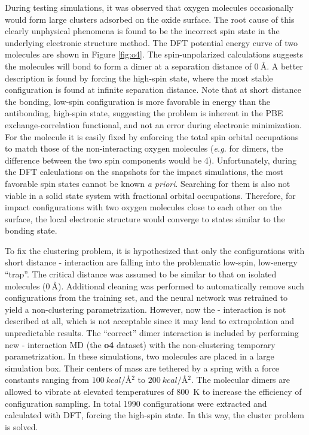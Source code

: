 \message{ !name(paper.tex)}\documentclass[manuscript=cmatex]{achemso}
\begin{document}
During testing simulations, it was observed that oxygen molecules occasionally would form large clusters adsorbed on the oxide surface. The root cause of this clearly unphysical phenomena is found to be the incorrect spin state in the underlying electronic structure method. The DFT potential energy curve of two  molecules are shown in Figure \ref{fig:o4}. The spin-unpolarized calculations suggests the molecules will bond to form a  dimer at a separation distance of \textbf{$\SI{0}{\angstrom}$}. A better description is found by forcing the high-spin state, where the most stable configuration is found at infinite separation distance. Note that at short distance the bonding, low-spin configuration is more favorable in energy than the antibonding, high-spin state, suggesting the problem is inherent in the PBE exchange-correlation functional, and not an error during electronic minimization. For the molecule it is easily fixed by enforcing the total spin orbital occupations to match those of the non-interacting oxygen molecules (\textit{e.g.} for dimers, the difference between the two spin components would be 4). Unfortunately, during the DFT calculations on the snapshots for the impact simulations, the most favorable spin states cannot be known \textit{a priori}. Searching for them is also not viable in a solid state system with fractional orbital occupations. Therefore, for impact configurations with two oxygen molecules close to each other on the surface, the local electronic structure would converge to states similar to the bonding state. 

To fix the clustering problem, it is hypothesized that only the configurations with short distance - interaction are falling into the problematic low-spin, low-energy ``trap''. The critical distance was assumed to be similar to that on isolated molecules (\textbf{$\SI{0}{\angstrom}$}). Additional cleaning was performed to automatically remove such configurations from the training set, and the neural network was retrained to yield a non-clustering parametrization. However, now the - interaction is not described at all, which is not acceptable since it may lead to extrapolation and unpredictable results. The ``correct'' dimer interaction is included by performing new - interaction MD (the \textbf{o4} dataset) with the non-clustering temporary parametrization. In these simulations, two  molecules are placed in a large simulation box. Their centers of mass are tethered by a spring with a force constants ranging from $\SI{100}{kcal/\angstrom^2}$ to $\SI{200}{kcal/\angstrom^2}$. The molecular dimers are allowed to vibrate at elevated temperatures of \SI{800}{K} to increase the efficiency of configuration sampling. In total 1990 configurations were extracted and calculated with DFT, forcing the high-spin state. In this way, the cluster problem is solved.
\end{document}
